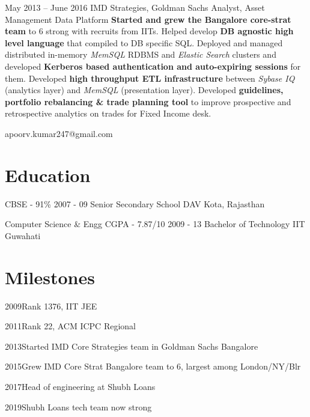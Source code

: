 \documentclass{tccv}
\begin{document}
\begin{eventlist}
\item{May 2013 -- June 2016}
     {IMD Strategies, Goldman Sachs}
     {Analyst, Asset Management Data Platform}
	\textbf{Started and grew the Bangalore core-strat team} to 6 strong with recruits from IITs.\newline
	Helped develop \textbf{DB agnostic high level language} that compiled to DB specific SQL.\newline
	Deployed and managed distributed in-memory \textit{MemSQL} RDBMS and \textit{Elastic Search} clusters and developed \textbf{Kerberos based authentication and auto-expiring sessions} for them. \newline
	Developed \textbf{high throughput ETL infrastructure} between \textit{Sybase IQ} (analytics layer) and \textit{MemSQL} (presentation layer).\newline
	Developed \textbf{guidelines, portfolio rebalancing \& trade planning tool} to improve prospective and retrospective analytics on trades for Fixed Income desk.



\end{eventlist}



    {apoorv.kumar247@gmail.com}

\section{Education}

\begin{yearlist}

\item[CBSE - 91\%]{2007 - 09}
     {Senior Secondary School}
     {DAV Kota, Rajasthan}

\item[Computer Science \& Engg \newline CGPA - 7.87/10]{2009 - 13}
     {Bachelor of Technology}
     {IIT Guwahati}

\end{yearlist}

\section{Milestones}

\begin{factlist}
	\item{2009}{Rank 1376, IIT JEE}
	\item{2011}{Rank 22, ACM ICPC Regional}
	\item{2013}{Started IMD Core Strategies team in Goldman Sachs Bangalore}
	\item{2015}{Grew IMD Core Strat Bangalore team to 6, largest among London/NY/Blr}
	\item{2017}{Head of engineering at Shubh Loans}
	\item{2019}{Shubh Loans tech team now  strong}
\end{factlist}
\end{document}
